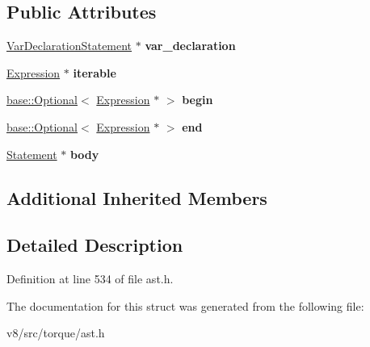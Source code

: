 \subsection*{Public Attributes}
\begin{DoxyCompactItemize}
\item 
\mbox{\label{structv8_1_1internal_1_1torque_1_1ForOfLoopStatement_a0e8bcc71ee9b389bfee75a48d3e55dc9}} 
\mbox{\hyperlink{structv8_1_1internal_1_1torque_1_1VarDeclarationStatement}{Var\+Declaration\+Statement}} $\ast$ {\bfseries var\+\_\+declaration}
\item 
\mbox{\label{structv8_1_1internal_1_1torque_1_1ForOfLoopStatement_ad3b32aaf1547a73b5905565a053f48f6}} 
\mbox{\hyperlink{structv8_1_1internal_1_1torque_1_1Expression}{Expression}} $\ast$ {\bfseries iterable}
\item 
\mbox{\label{structv8_1_1internal_1_1torque_1_1ForOfLoopStatement_adc4b7a556147ee89c6ecbbe3448140df}} 
\mbox{\hyperlink{classv8_1_1base_1_1Optional}{base\+::\+Optional}}$<$ \mbox{\hyperlink{structv8_1_1internal_1_1torque_1_1Expression}{Expression}} $\ast$ $>$ {\bfseries begin}
\item 
\mbox{\label{structv8_1_1internal_1_1torque_1_1ForOfLoopStatement_aa410954113e463019668b9003a131d8d}} 
\mbox{\hyperlink{classv8_1_1base_1_1Optional}{base\+::\+Optional}}$<$ \mbox{\hyperlink{structv8_1_1internal_1_1torque_1_1Expression}{Expression}} $\ast$ $>$ {\bfseries end}
\item 
\mbox{\label{structv8_1_1internal_1_1torque_1_1ForOfLoopStatement_a66cde0c6b1ece976b433cd7d61bb8b55}} 
\mbox{\hyperlink{structv8_1_1internal_1_1torque_1_1Statement}{Statement}} $\ast$ {\bfseries body}
\end{DoxyCompactItemize}
\subsection*{Additional Inherited Members}


\subsection{Detailed Description}


Definition at line 534 of file ast.\+h.



The documentation for this struct was generated from the following file\+:\begin{DoxyCompactItemize}
\item 
v8/src/torque/ast.\+h\end{DoxyCompactItemize}
